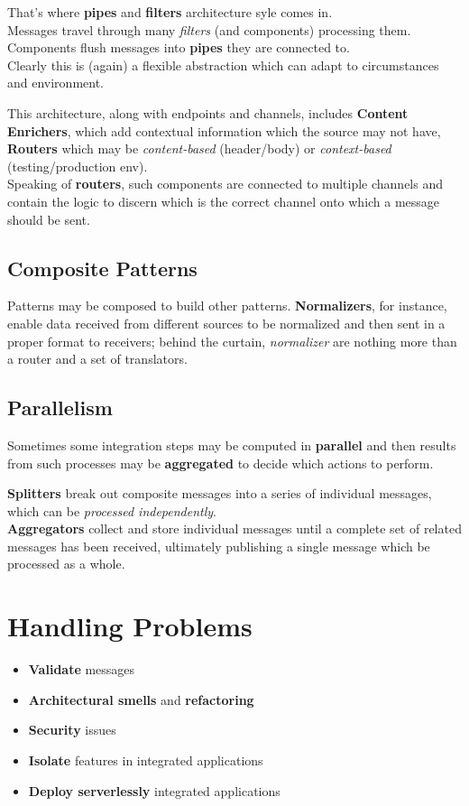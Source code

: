 That's where \textbf{pipes} and \textbf{filters} architecture syle comes in.\\
Messages travel through many \textit{filters} (and components) processing them.
Components flush messages into \textbf{pipes} they are connected to.\\
Clearly this is (again) a flexible abstraction which can adapt to circumstances and environment.

This architecture, along with endpoints and channels,
includes \textbf{Content Enrichers}, which add contextual information which the source may not have, \textbf{Routers} which may be \textit{content-based} (header/body) or \textit{context-based} (testing/production env).\\
Speaking of \textbf{routers}, such components are connected to multiple channels and contain the logic to discern which is the correct channel onto which a message should be sent.

\subsection{Composite Patterns}
Patterns may be composed to build other patterns.
\textbf{Normalizers}, for instance, enable data received from different sources to be normalized and then sent in a proper format to receivers;
behind the curtain, \textit{normalizer} are nothing more than a router and a set of translators.

\subsection{Parallelism}
Sometimes some integration steps may be computed in \textbf{parallel} and then results from such processes may be \textbf{aggregated} to decide which actions to perform.

\textbf{Splitters} break out composite messages into a series of individual messages, which can be \textit{processed independently}.\\
\textbf{Aggregators} collect and store individual messages until a complete set of related messages has been received,
ultimately publishing a single message which be processed as a whole. 


\section{Handling Problems}
\begin{itemize}
   \item \textbf{Validate} messages
   \item \textbf{Architectural smells} and \textbf{refactoring}
   \item \textbf{Security} issues
   \item \textbf{Isolate} features in integrated applications
   \item \textbf{Deploy serverlessly} integrated applications
\end{itemize}